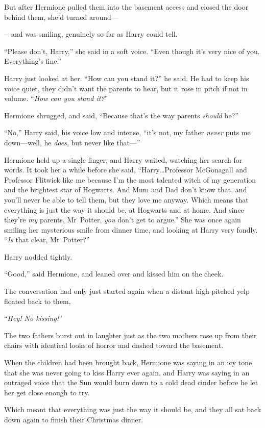 But after Hermione pulled them into the basement access and closed the door behind them, she’d turned around—

—and was smiling, genuinely so far as Harry could tell.

“Please don’t, Harry,” she said in a soft voice.
“Even though it’s very nice of you. Everything’s fine.”

Harry just looked at her.
“How can you stand it?” he said. He had to keep his voice quiet, they didn’t want the parents to hear, but it rose in pitch if not in volume. “\emph{How can you stand it?}”

Hermione shrugged, and said,
“Because that’s the way parents \emph{should} be?”

“No,” Harry said, his voice low and intense, “it’s not, my father \emph{never} puts me down—well, he \emph{does}, but never like that—”

Hermione held up a single finger, and Harry waited, watching her search for words. It took her a while before she said,
“Harry…Professor McGonagall and Professor Flitwick like me because I’m the most talented witch of my generation and the brightest star of Hogwarts. And Mum and Dad don’t know that, and you’ll never be able to tell them, but they love me anyway. Which means that everything is just the way it should be, at Hogwarts and at home. And since they’re \emph{my} parents, Mr~Potter, \emph{you} don’t get to argue.” She was once again smiling her mysterious smile from dinner time, and looking at Harry very fondly. “\emph{Is} that clear, Mr~Potter?”

Harry nodded tightly.

“Good,” said Hermione, and leaned over and kissed him on the cheek.

\later

The conversation had only just started again when a distant high-pitched yelp floated back to them,

“\emph{Hey! No kissing!}”

The two fathers burst out in laughter just as the two mothers rose up from their chairs with identical looks of horror and dashed toward the basement.

When the children had been brought back, Hermione was saying in an icy tone that she was never going to kiss Harry ever again, and Harry was saying in an outraged voice that the Sun would burn down to a cold dead cinder before he let her get close enough to try.

Which meant that everything was just the way it should be, and they all sat back down again to finish their Christmas dinner.


